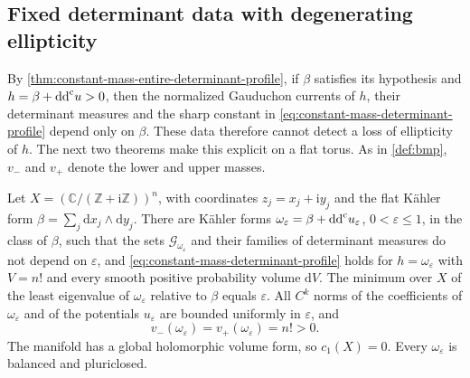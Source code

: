 \subsection{Fixed determinant data with degenerating ellipticity}
By \cref{thm:constant-mass-entire-determinant-profile}, if $\beta$ satisfies its hypothesis and $h=\beta+\mathrm{dd}^{\mathrm{c}} u>0$, then the normalized Gauduchon currents of $h$, their determinant measures and the sharp constant in \eqref{eq:constant-mass-determinant-profile} depend only on $\beta$. These data therefore cannot detect a loss of ellipticity of $h$. The next two theorems make this explicit on a flat torus. As in \cref{def:bmp}, $v_-$ and $v_+$ denote the lower and upper masses.
\begin{theorem}\label{thm:fixed-determinant-closed-degeneration}
Let $X=(\mathbb C/(\mathbb Z+\mathrm i\mathbb Z))^n$, with coordinates $z_j=x_j+\mathrm iy_j$ and the flat K\"ahler form $\beta=\sum_j\mathrm dx_j\wedge\mathrm dy_j$. There
are K\"ahler forms $\omega_\varepsilon=\beta+\mathrm{dd}^{\mathrm{c}} u_\varepsilon$, $0<\varepsilon\leq1$, in the
class of $\beta$, such that the sets $\mathscr G_{\omega_\varepsilon}$ and their
families of determinant measures do not depend on $\varepsilon$, and \eqref{eq:constant-mass-determinant-profile} holds for $h=\omega_\varepsilon$ with $V=n!$ and every smooth positive probability volume $\mathrm dV$.
The minimum over $X$ of the least eigenvalue of $\omega_\varepsilon$ relative to $\beta$ equals $\varepsilon$.
All $C^k$ norms of the coefficients of $\omega_\varepsilon$ and of the
potentials $u_\varepsilon$ are bounded uniformly in $\varepsilon$, and
\[
 v_-(\omega_\varepsilon)=v_+(\omega_\varepsilon)=n!>0.
\]
The manifold has a global holomorphic volume form, so $c_1(X)=0$.
Every $\omega_\varepsilon$ is balanced and pluriclosed.
\end{theorem}
